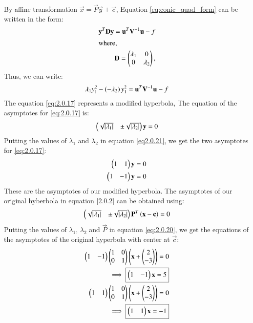 \documentclass[journal,12pt,twocolumn]{IEEEtran}
\begin{document}
By affine transformation $\vec{x} = \vec{P}\vec{y}+\vec{c} $,  Equation \eqref{eq:conic_quad_form} can be written in the form:
\begin{align} 
\mathbf{y}^T\mathbf{D}\mathbf{y} =  \mathbf{u}^T\mathbf{V}^{-1}\mathbf{u} -f \\
\intertext{where,}
\mathbf{D} = \begin{pmatrix}\lambda_1 & 0\\ 0 & \lambda_2\end{pmatrix},
\label{eq:quad_form_hyper}
\end{align}
Thus, we can write:
\begin{align}
    \lambda_1y_1^2 -\left(-\lambda_2\right)y_1^2 = \mathbf{u}^T\mathbf{V}^{-1}\mathbf{u} -f \label{eq:2.0.17}
\end{align}
The equation \eqref{eq:2.0.17} represents a modified hyperbola, The equation of the asymptotes for \eqref{eq:2.0.17} is:
\begin{align} 
\begin{pmatrix}\sqrt{\left\vert\lambda_1\right\vert} & \pm \sqrt{\left\vert\lambda_2\right\vert}\end{pmatrix}\mathbf{y} = 0 \label{eq2.0.21}
\end{align} 
Putting the values of $\lambda_1$ and $\lambda_2$ in equation \eqref{eq2.0.21}, we get the two asymptotes for \eqref{eq:2.0.17}:
\begin{align} 
\begin{pmatrix}1 & 1\end{pmatrix}\mathbf{y} = 0 \\
\begin{pmatrix}1 & -1\end{pmatrix}\mathbf{y} = 0
\end{align} 
These are the asymptotes of our modified hyperbola. The asymptotes of our original hyberbola in equation \eqref{2.0.2} can be obtained using:
\begin{align} 
\label{eq:quad_form_pair}
\begin{pmatrix}\sqrt{\left\vert\lambda_1\right\vert} & \pm \sqrt{\left\vert\lambda_2\right\vert}\end{pmatrix}\mathbf{P}^T\left(\mathbf{x}-\mathbf{c}\right) = 0
\label{eq:2.0.20}
\end{align} 
Putting the values of $\lambda_1$, $\lambda_2$ and $\vec{P}$  in equation \eqref{eq:2.0.20}, we get the equations of the asymptotes of the original hyperbola with center at $\Vec{c}$:
\begin{align} 
    \myvec{1 &-1}\myvec{1&0 \\0& 1}\brak{\vec{x}+\myvec{2 \\-3}}=0\\
    \implies \boxed{\myvec{1 &-1}\Vec{x}=5} \label{2.0.26}\\
    \myvec{1 & 1}\myvec{1&0 \\0& 1}\brak{\vec{x}+\myvec{2 \\-3}}=0\\
     \implies \boxed{\myvec{1 &1}\Vec{x}=-1} \label{2.0.28}
\end{align}
\end{document}
